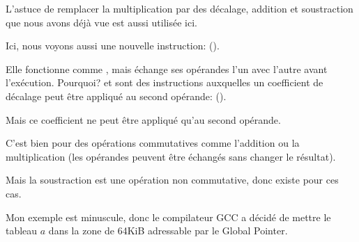L'astuce de remplacer la multiplication par des décalage, addition et soustraction
que nous avons déjà vue est aussi utilisée ici.

Ici, nous voyons aussi une nouvelle instruction: \RSB ().

Elle fonctionne comme \SUB, mais échange ses opérandes l'un avec l'autre avant l'exécution.
Pourquoi?
\SUB et \RSB sont des instructions auxquelles un coefficient de décalage peut être
appliqué au second opérande: ().

Mais ce coefficient ne peut être appliqué qu'au second opérande.

C'est bien pour des opérations commutatives comme l'addition ou la multiplication
(les opérandes peuvent être échangés sans changer le résultat).

Mais la soustraction est une opération non commutative, donc \RSB existe pour ces
cas.


Mon exemple est minuscule, donc le compilateur GCC a décidé de mettre le tableau
$a$ dans la zone de 64KiB adressable par le Global Pointer.



